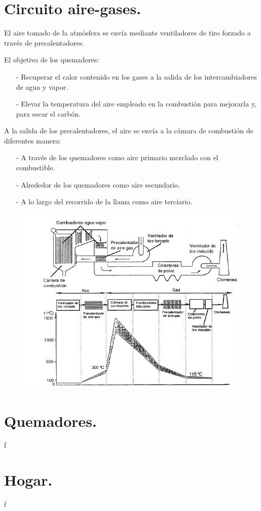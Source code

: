 \section{Circuito aire-gases.}
El aire tomado de la atmósfera se envía mediante ventiladores de tiro forzado a través de precalentadores.

El objetivo de los quemadores:
\begin{itemize}
	\item [-] Recuperar el calor contenido en los gases a la salida de los intercambiadores de agua y vapor.
	\item [-] Elevar la temperatura del aire empleado en la combustión para mejorarla y, para secar el carbón.
\end{itemize}


A la salida de los precalentadores, el aire se envía a la cámara de combustión de diferentes manera:
\begin{itemize}
	\item [-] A través de los quemadores como aire primario mezclado con el combustible.
	\item [-] Alrededor de los quemadores como aire secundario.
	\item [-] A lo largo del recorrido de la llama como aire terciario.
\end{itemize}

\begin{figure}[H]
	\centering
	\includegraphics[width=0.7\linewidth]{res/tema10/circuitoAwaGas}
	\label{fig:circuitoawagas}
\end{figure}

\section{Quemadores.}
f
\section{Hogar.}
f
